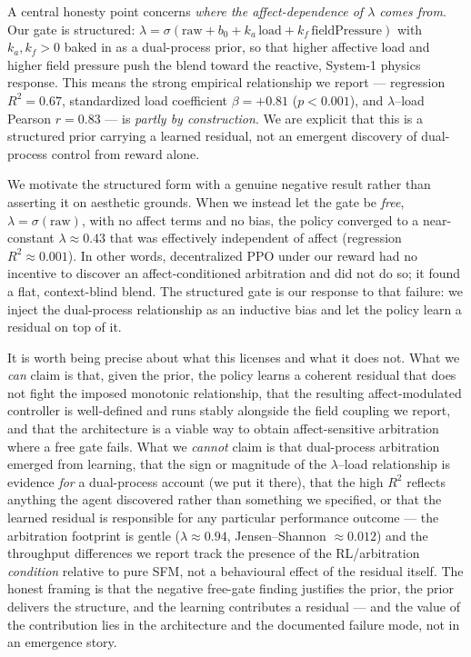 \documentclass[sigconf,nonacm]{acmart}
\begin{document}
A central honesty point concerns \emph{where the affect-dependence of $\lambda$ comes from}. Our gate is structured: $\lambda = \sigma(\text{raw} + b_0 + k_a\,\text{load} + k_f\,\text{fieldPressure})$ with $k_a, k_f > 0$ baked in as a dual-process prior, so that higher affective load and higher field pressure push the blend toward the reactive, System-1 physics response. This means the strong empirical relationship we report --- regression $R^2 = 0.67$, standardized load coefficient $\beta = +0.81$ ($p < 0.001$), and $\lambda$--load Pearson $r = 0.83$ --- is \emph{partly by construction}. We are explicit that this is a structured prior carrying a learned residual, not an emergent discovery of dual-process control from reward alone.

We motivate the structured form with a genuine negative result rather than asserting it on aesthetic grounds. When we instead let the gate be \emph{free}, $\lambda = \sigma(\text{raw})$, with no affect terms and no bias, the policy converged to a near-constant $\lambda \approx 0.43$ that was effectively independent of affect (regression $R^2 \approx 0.001$). In other words, decentralized PPO under our reward had no incentive to discover an affect-conditioned arbitration and did not do so; it found a flat, context-blind blend. The structured gate is our response to that failure: we inject the dual-process relationship as an inductive bias and let the policy learn a residual on top of it.

It is worth being precise about what this licenses and what it does not. What we \emph{can} claim is that, given the prior, the policy learns a coherent residual that does not fight the imposed monotonic relationship, that the resulting affect-modulated controller is well-defined and runs stably alongside the field coupling we report, and that the architecture is a viable way to obtain affect-sensitive arbitration where a free gate fails. What we \emph{cannot} claim is that dual-process arbitration emerged from learning, that the sign or magnitude of the $\lambda$--load relationship is evidence \emph{for} a dual-process account (we put it there), that the high $R^2$ reflects anything the agent discovered rather than something we specified, or that the learned residual is responsible for any particular performance outcome --- the arbitration footprint is gentle ($\lambda \approx 0.94$, Jensen--Shannon $\approx 0.012$) and the throughput differences we report track the presence of the RL/arbitration \emph{condition} relative to pure SFM, not a behavioural effect of the residual itself. The honest framing is that the negative free-gate finding justifies the prior, the prior delivers the structure, and the learning contributes a residual --- and the value of the contribution lies in the architecture and the documented failure mode, not in an emergence story.
\end{document}
